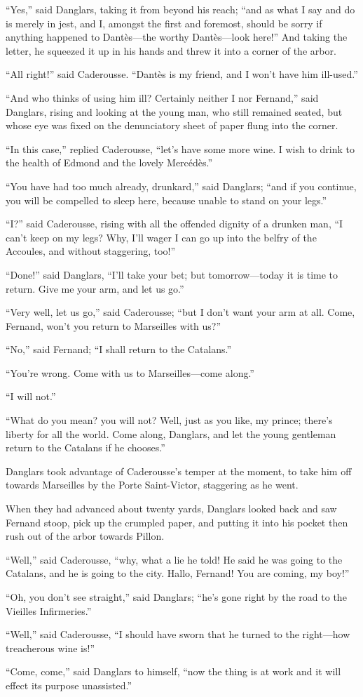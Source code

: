 “Yes,” said Danglars, taking it from beyond his reach; “and as what I
say and do is merely in jest, and I, amongst the first and foremost,
should be sorry if anything happened to Dantès—the worthy Dantès—look
here!” And taking the letter, he squeezed it up in his hands and threw
it into a corner of the arbor.

“All right!” said Caderousse. “Dantès is my friend, and I won’t have
him ill-used.”

“And who thinks of using him ill? Certainly neither I nor Fernand,”
said Danglars, rising and looking at the young man, who still remained
seated, but whose eye was fixed on the denunciatory sheet of paper
flung into the corner.

“In this case,” replied Caderousse, “let’s have some more wine. I wish
to drink to the health of Edmond and the lovely Mercédès.”

“You have had too much already, drunkard,” said Danglars; “and if you
continue, you will be compelled to sleep here, because unable to stand
on your legs.”

“I?” said Caderousse, rising with all the offended dignity of a drunken
man, “I can’t keep on my legs? Why, I’ll wager I can go up into the
belfry of the Accoules, and without staggering, too!”

“Done!” said Danglars, “I’ll take your bet; but tomorrow—today it is
time to return. Give me your arm, and let us go.”

“Very well, let us go,” said Caderousse; “but I don’t want your arm at
all. Come, Fernand, won’t you return to Marseilles with us?”

“No,” said Fernand; “I shall return to the Catalans.”

“You’re wrong. Come with us to Marseilles—come along.”

“I will not.”

“What do you mean? you will not? Well, just as you like, my prince;
there’s liberty for all the world. Come along, Danglars, and let the
young gentleman return to the Catalans if he chooses.”

Danglars took advantage of Caderousse’s temper at the moment, to take
him off towards Marseilles by the Porte Saint-Victor, staggering as he
went.

When they had advanced about twenty yards, Danglars looked back and saw
Fernand stoop, pick up the crumpled paper, and putting it into his
pocket then rush out of the arbor towards Pillon.

“Well,” said Caderousse, “why, what a lie he told! He said he was going
to the Catalans, and he is going to the city. Hallo, Fernand! You are
coming, my boy!”

“Oh, you don’t see straight,” said Danglars; “he’s gone right by the
road to the Vieilles Infirmeries.”

“Well,” said Caderousse, “I should have sworn that he turned to the
right—how treacherous wine is!”

“Come, come,” said Danglars to himself, “now the thing is at work and
it will effect its purpose unassisted.”

